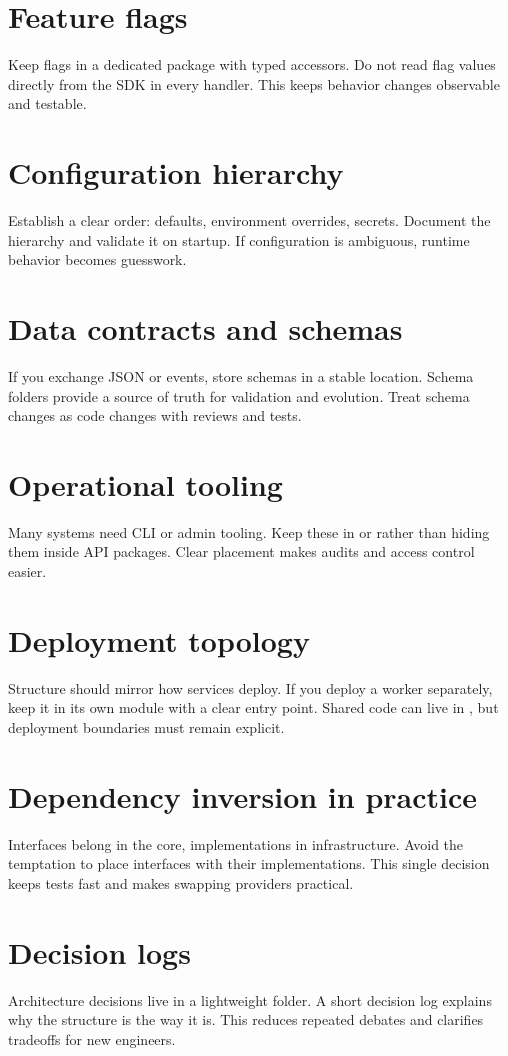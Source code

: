 \section{Feature flags}
Keep flags in a dedicated package with typed accessors.
Do not read flag values directly from the SDK in every handler.
This keeps behavior changes observable and testable.

\section{Configuration hierarchy}
Establish a clear order: defaults, environment overrides, secrets.
Document the hierarchy and validate it on startup.
If configuration is ambiguous, runtime behavior becomes guesswork.

\section{Data contracts and schemas}
If you exchange JSON or events, store schemas in a stable location.
Schema folders provide a source of truth for validation and evolution.
Treat schema changes as code changes with reviews and tests.

\section{Operational tooling}
Many systems need CLI or admin tooling.
Keep these in  or  rather than hiding them inside API packages.
Clear placement makes audits and access control easier.

\section{Deployment topology}
Structure should mirror how services deploy.
If you deploy a worker separately, keep it in its own module with a clear entry point.
Shared code can live in , but deployment boundaries must remain explicit.

\section{Dependency inversion in practice}
Interfaces belong in the core, implementations in infrastructure.
Avoid the temptation to place interfaces with their implementations.
This single decision keeps tests fast and makes swapping providers practical.

\section{Decision logs}
Architecture decisions live in a lightweight  folder.
A short decision log explains why the structure is the way it is.
This reduces repeated debates and clarifies tradeoffs for new engineers.


